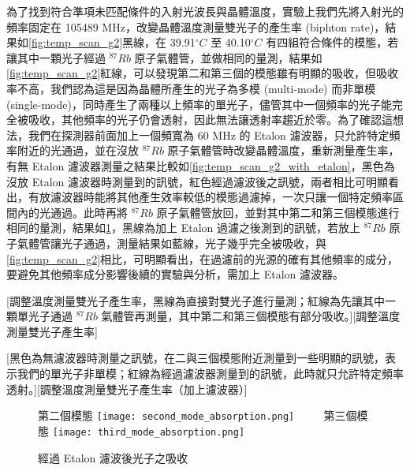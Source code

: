 \documentclass[class=NCU_thesis, crop=false]{standalone}
\begin{document}
為了找到符合準項未匹配條件的入射光波長與晶體溫度，實驗上我們先將入射光的頻率固定在 105489 MHz，改變晶體溫度測量雙光子的產生率 (biphton rate)，結果如\cref{fig:temp_scan_g2}黑線，在 39.91$^{\circ}C$ 至 40.10$^{\circ}C$ 有四組符合條件的模態，若讓其中一顆光子經過 $^{87}Rb$ 原子氣體管，並做相同的量測，結果如\cref{fig:temp_scan_g2}紅線，可以發現第二和第三個的模態雖有明顯的吸收，但吸收率不高，我們認為這是因為晶體所產生的光子為多模 (multi-mode) 而非單模 (single-mode)，同時產生了兩種以上頻率的單光子，儘管其中一個頻率的光子能完全被吸收，其他頻率的光子仍會透射，因此無法讓透射率趨近於零。為了確認這想法，我們在探測器前面加上一個頻寬為 60 MHz 的 Etalon 濾波器，只允許特定頻率附近的光通過，並在沒放 $^{87}Rb$ 原子氣體管時改變晶體溫度，重新測量產生率，有無 Etalon 濾波器測量之結果比較如\cref{fig:temp_scan_g2_with_etalon}，黑色為沒放 Etalon 濾波器時測量到的訊號，紅色經過濾波後之訊號，兩者相比可明顯看出，有放濾波器時能將其他產生效率較低的模態過濾掉，一次只讓一個特定頻率區間內的光通過。此時再將 $^{87}Rb$ 原子氣體管放回，並對其中第二和第三個模態進行相同的量測，結果如\cref{fig:absorption_etalon_temp_scanning}，黑線為加上 Etalon 過濾之後測到的訊號，若放上 $^{87}Rb$ 原子氣體管讓光子通過，測量結果如藍線，光子幾乎完全被吸收，與\cref{fig:temp_scan_g2}相比，可明顯看出，在過濾前的光源的確有其他頻率的成分，要避免其他頻率成分影響後續的實驗與分析，需加上 Etalon 濾波器。

[調整溫度測量雙光子產生率，黑線為直接對雙光子進行量測；紅線為先讓其中一顆單光子通過 $^{87}Rb$ 氣體管再測量，其中第二和第三個模態有部分吸收。][調整溫度測量雙光子產生率]

[黑色為無濾波器時測量之訊號，在二與三個模態附近測量到一些明顯的訊號，表示我們的單光子非單模；紅線為經過濾波器測量到的訊號，此時就只允許特定頻率透射。][調整溫度測量雙光子產生率（加上濾波器）]

\begin{figure}[!hbt]
    \centering
    \subcaptionbox
        {第二個模態
        \label{fig:subfig_fig1}}
        {\texttt{[image: second\_mode\_absorption.png]}}
    ~~~~
    \subcaptionbox
        {第三個模態
        \label{fig:subfig_fig2}}
        {\texttt{[image: third\_mode\_absorption.png]}}
    \caption{經過 Etalon 濾波後光子之吸收}
    \label{fig:absorption_etalon_temp_scanning}
\end{figure}
\end{document}
